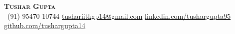 \begin{center}
    \textbf{\huge \scshape \color{RoyalBlue} Tushar Gupta} \\ \vspace{2pt}
     \ \small (91) 95470-10744 \quad
    \href{mailto:tushariitkgp14@gmail.com}{ tushariitkgp14@gmail.com} \quad
    \href{https://www.linkedin.com/in/tushargupta95}{ linkedin.com/tushargupta95} \quad
    \href{https://github.com/tushargupta14}{ github.com/tushargupta14}
\end{center}